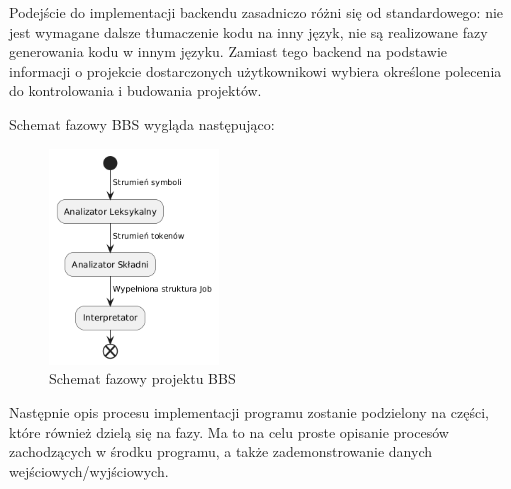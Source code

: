 Podejście do implementacji backendu zasadniczo różni się od standardowego: nie jest wymagane dalsze tłumaczenie kodu na inny język, nie są realizowane fazy generowania kodu w innym języku. Zamiast tego backend na podstawie informacji o projekcie dostarczonych użytkownikowi wybiera określone polecenia do kontrolowania i budowania projektów.

Schemat fazowy BBS wygląda następująco:

\begin{figure}[h]
    \caption{Schemat fazowy projektu BBS}
    \centering
    \includegraphics[width=0.4\textwidth]{Images/phases.png}
\end{figure}

Następnie opis procesu implementacji programu zostanie podzielony na części, które również dzielą się na fazy. Ma to na celu proste opisanie procesów zachodzących w środku programu, a także zademonstrowanie danych wejściowych/wyjściowych.